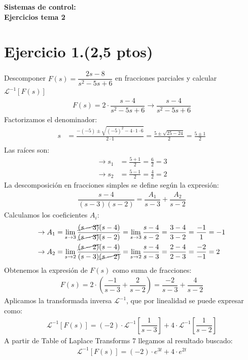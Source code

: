 \documentclass{article}
\begin{document}
\begin{flushleft}
    \huge\textbf{Sistemas de control: \\Ejercicios tema 2}
\end{flushleft}
\section*{Ejercicio 1.(2,5 ptos)}
Descomponer $F(s) = \dfrac{2s - 8}{s^2 - 5s + 6}$ en fracciones parciales y calcular $\mathcal{L}^{-1}[F(s)]$
\begin{align*}
    F(s) = 2\cdot\dfrac{s - 4}{s^2 - 5s + 6}\rightarrow \dfrac{s - 4}{s^2 - 5s + 6}
\end{align*}
Factorizamos el denominador:
\begin{align*}
    s &= \frac{-(-5) \pm \sqrt{(-5)^2 - 4\cdot1\cdot6}}{2\cdot1}
    = \frac{5 \pm \sqrt{25 - 24}}{2}
    = \frac{5 \pm 1}{2} \\
\end{align*}
Las raíces son:
\begin{align*}
    \rightarrow s_1 &= \frac{5 + 1}{2} = \frac{6}{2} = 3 \\
    \rightarrow s_2 &= \frac{5 - 1}{2} = \frac{4}{2} = 2
\end{align*}
La descomposición en fracciones simples se define según la expresión:
\begin{align*}
    \dfrac{s - 4}{(s - 3) (s - 2)} = \dfrac{A_1}{s - 3} + \dfrac{A_2}{s - 2}
\end{align*}
Calculamos los coeficientes $A_i$:
\begin{align*}
    \rightarrow A_1 
    &= \lim_{s \to 3} \dfrac{\cancel{(s - 3)} (s - 4)}{\cancel{(s - 3)}(s - 2)}
    = \lim_{s \to 3} \dfrac{s - 4}{s - 2}
    = \dfrac{3 - 4}{3 - 2}
    = \dfrac{-1}{1}
    = -1 \\
    \rightarrow A_2 
    &= \lim_{s \to 2} \dfrac{\cancel{(s - 2)} (s - 4)}{(s - 3) \cancel{(s - 2)}}
    = \lim_{s \to 2} \dfrac{s - 4}{s - 3}
    = \dfrac{2 - 4}{2 - 3}
    = \dfrac{-2}{-1}
    = 2
\end{align*}
Obtenemos la expresión de $F(s)$ como suma de fracciones:
\begin{align*}
    F(s) 
    = 2\cdot\left(\dfrac{-1}{s - 3} + \dfrac{2}{s - 2}\right)
    = \dfrac{-2}{s - 3} + \dfrac{4}{s - 2} 
\end{align*}
Aplicamos la transformada inversa $\mathcal{L}^{-1}$,
que por linealidad se puede expresar como:
\begin{align*}
    \mathcal{L}^{-1}[F(s)]
    = (-2)\cdot\mathcal{L}^{-1}\left[\dfrac{1}{s - 3}\right]
    + 4\cdot\mathcal{L}^{-1}\left[\dfrac{1}{s - 2}\right]
\end{align*}
A partir de Table of Laplace Transforms 7 llegamos al resultado buscado:
\begin{align*}
    \mathcal{L}^{-1}[F(s)]
    = (-2) \cdot e^{3t} + 4 \cdot e^{2t}
\end{align*}
\end{document}
